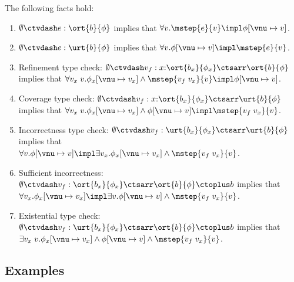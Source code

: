 \begin{corollary} The following facts hold:
  \begin{enumerate}
    \item $\emptyset \ctvdash e : \ort{b}{\phi}$ implies that $\forall v. \mstep{e}{v} \impl \phi[\vnu \mapsto v]$.
    \item $\emptyset \ctvdash e : \urt{b}{\phi}$ implies that $\forall v. \phi[\vnu \mapsto v] \impl \mstep{e}{v}$.
    \item Refinement type check: $\emptyset \ctvdash v_f :  x{:}\ort{b_x}{\phi_x} \ctsarr \ort{b}{\phi}$ implies that $\forall v_x\;v. \phi_x[\vnu \mapsto v_x] \land \mstep{v_f\;v_x}{v} \impl \phi[\vnu \mapsto v]$.
    \item Coverage type check: $\emptyset \ctvdash v_f :  x{:}\ort{b_x}{\phi_x} \ctsarr \urt{b}{\phi}$ implies that $\forall v_x\;v. \phi_x[\vnu \mapsto v_x] \land \phi[\vnu \mapsto v]  \impl \mstep{v_f\;v_x}{v} $.
    \item Incorrectness type check: $\emptyset \ctvdash v_f : \urt{b_x}{\phi_x} \ctsarr \urt{b}{\phi}$ implies that \\ $\forall v. \phi[\vnu \mapsto v] \impl \exists v_x. \phi_x[\vnu \mapsto v_x] \land  \mstep{v_f\;v_x}{v} $.
    \item Sufficient incorrectness: $\emptyset \ctvdash v_f : \ort{b_x}{\phi_x} \ctsarr \ort{b}{\phi} \ctoplus b$ implies that \\ $\forall v_x. \phi_x[\vnu \mapsto v_x] \impl \exists v. \phi[\vnu \mapsto v] \land \mstep{v_f\;v_x}{v} $.
    \item Existential type check: $\emptyset \ctvdash v_f : \urt{b_x}{\phi_x} \ctsarr \ort{b}{\phi}\ctoplus b$ implies that \\ $\exists v_x\;v. \phi_x[\vnu \mapsto v_x] \land \phi[\vnu \mapsto v] \land \mstep{v_f\;v_x}{v} $.
  \end{enumerate}
\end{corollary}

\newpage
\subsection{Examples}

